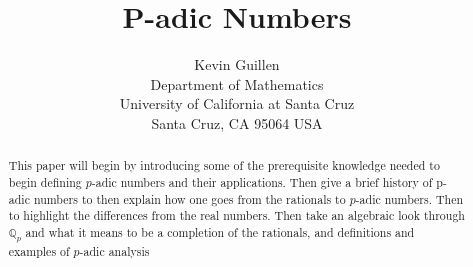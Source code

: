 \documentclass[12pt]{article}
\theoremstyle{definition}
\theoremstyle{remark}
\newcommand{\qq}{\mathbb Q}   %
\begin{document}
\title{P-adic Numbers}

\author{Kevin Guillen \\ 
Department of Mathematics \\
University of California at Santa Cruz \\
Santa Cruz, CA 95064 USA}

\maketitle

\begin{abstract}
This paper will begin by introducing some of the prerequisite knowledge needed to begin defining $p$-adic numbers and their applications. Then give a brief history of p-adic numbers to then explain how one goes from the rationals to $p$-adic numbers. Then to highlight the differences from the real numbers. Then take an algebraic look through $\qq_p$ and what it means to be a completion of the rationals, and definitions and examples of  $p$-adic analysis
\end{abstract}
\end{document}
